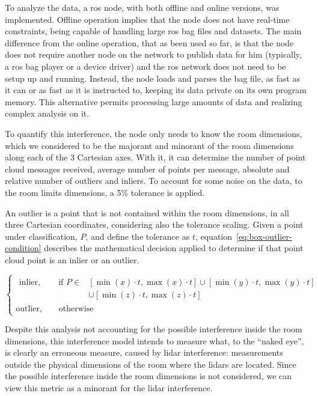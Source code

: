 To analyze the data, a \ac{ros} node, with both offline and online versions, was implemented. Offline operation implies that the node does not have real-time constraints, being capable of handling large \ac{ros} bag files and datasets. The main difference from the online operation, that as been used so far, is that the node does not require another node on the network to publish data for him (typically, a \ac{ros} bag player or a device driver) and the \ac{ros} network does not need to be setup up and running. Instead, the node loads and parses the bag file, as fast as it can or as fast as it is instructed to, keeping its data private on its own program memory. This alternative permits processing large amounts of data and realizing complex analysis on it.

To quantify this interference, the node only needs to know the room dimensions, which we considered to be the majorant and minorant of the room dimensions along each of the 3 Cartesian axes. With it, it can determine the number of point cloud messages received, average number of points per message, absolute and relative number of outliers and inliers. To account for some noise on the data, to the room limits dimensions, a 5\% tolerance is applied. 

An outlier is a point that is not contained within the room dimensions, in all three Cartesian coordinates, considering also the tolerance scaling. Given a point under classification, $P$, and define the tolerance as $t$, equation~\ref{eq:box-outlier-condition} describes the mathematical decision applied to determine if that point cloud point is an inlier or an outlier.

\begin{equation}
	\label{eq:box-outlier-condition}
	\begin{cases}
		\begin{aligned}
			\text{inlier}, \qquad \text{if\ } P \in & [\min(x) \cdot t, \max(x) \cdot t] \cup [\min(y) \cdot t, \max(y) \cdot t]  \\
																						&					 \cup [\min(z) \cdot t, \max(z) \cdot t] 
		\end{aligned} \\
		\text{outlier}, \qquad \text{otherwise}
	\end{cases}
\end{equation}

Despite this analysis not accounting for the possible interference inside the room dimensions, this interference model intends to measure what, to the ``naked eye'', is clearly an erroneous measure, caused by \ac{lidar} interference: measurements outside the physical dimensions of the room where the \acp{lidar} are located. Since the possible interference inside the room dimensions is not considered, we can view this metric as a minorant for the \ac{lidar} interference.


